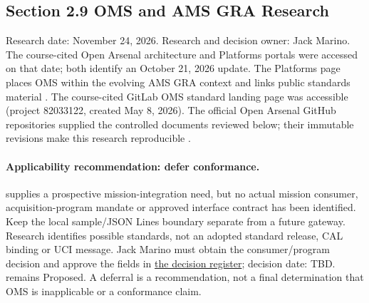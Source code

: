 \subsection{Section 2.9 OMS and AMS GRA Research}
\label{Section:OMSResearch}
Research date: November 24, 2026. Research and decision owner: Jack Marino.
The course-cited Open Arsenal architecture and Platforms portals were accessed
on that date; both identify an October 21, 2026 update. The Platforms page places
OMS within the evolving AMS GRA context and links public standards material
\cite{OpenArsenalArchitectures,OpenArsenalPlatforms}. The course-cited GitLab
OMS standard landing page was accessible (project 82033122, created May 8,
2026). The official Open Arsenal GitHub repositories supplied the controlled
documents reviewed below; their immutable revisions make this research reproducible
\cite{OpenArsenalGitLabOMS}.

\paragraph{Applicability recommendation: defer conformance.}
 supplies a prospective mission-integration need, but no
actual mission consumer, acquisition-program mandate or approved interface
contract has been identified. Keep the local sample/JSON Lines boundary separate
from a future gateway. Research identifies possible standards, not an adopted
standard release, CAL binding or UCI message. Jack Marino must obtain the
consumer/program decision and approve the fields in
\hyperref[Table:OMSDecisionFields]{the decision register}; decision date: TBD.
 remains Proposed. A deferral is a recommendation,
not a final determination that OMS is inapplicable or a conformance claim.

